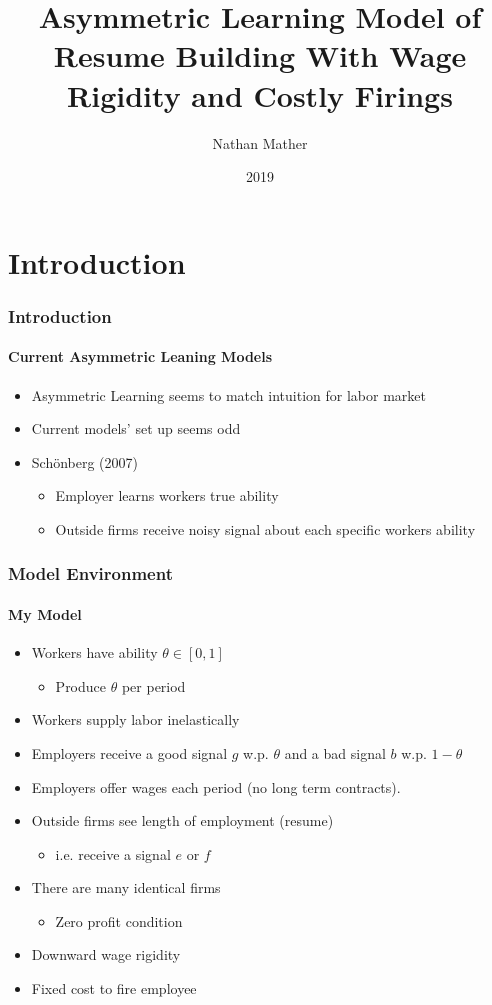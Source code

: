 \documentclass{beamer}
\title{Asymmetric Learning Model of Resume Building With Wage Rigidity and Costly Firings}
\author{Nathan Mather}
\institute{University of Michigan}
\date{2019}
\begin{document}
	
	
	
	\frame{\titlepage}
	
	\section{Introduction}
	
	\begin{frame}
	\frametitle{Introduction}
	
	\framesubtitle{Current Asymmetric Leaning Models}
	\begin{itemize}
		\setlength{\itemsep}{3mm}
		\item Asymmetric Learning seems to match intuition for labor market
		\item Current models' set up seems odd 
		\item Schönberg (2007)
		\begin{itemize}
			\item Employer learns workers true ability 
			\item Outside firms receive noisy signal about each specific workers ability 
		\end{itemize}
	\end{itemize}
\end{frame}





\begin{frame}
\frametitle{Model Environment}
\framesubtitle{My Model}
\begin{itemize}
	\setlength{\itemsep}{1mm}
	\item Workers have ability $\theta \in [0,1]$ 
	\begin{itemize}
		\setlength{\itemsep}{1mm}
		\item Produce $\theta$ per period 		
	\end{itemize}
\item Workers supply labor inelastically
\item Employers receive a good signal $g$ w.p. $\theta$ and a bad signal $b$ w.p. $1-\theta$
\item Employers offer wages each period (no long term contracts).
\item Outside firms see length of employment (resume)
\begin{itemize}
	\setlength{\itemsep}{1mm}
	\item i.e. receive a signal $e$ or $f$ 
\end{itemize}
	\item There are many identical firms
	\begin{itemize}
		\item Zero profit condition
	\end{itemize} 
	\item Downward wage rigidity 
	\item Fixed cost to fire employee

\end{itemize}
\end{frame}
\end{document}
